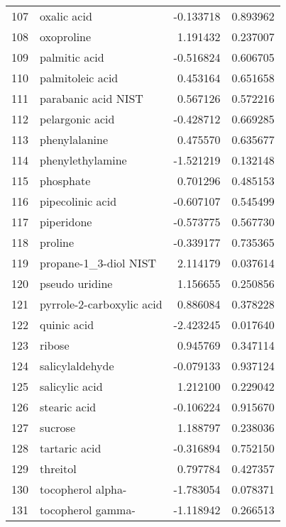 \begin{tabular}{llrr}
107 &                        oxalic acid & -0.133718 &  0.893962 \\
108 &                         oxoproline &  1.191432 &  0.237007 \\
109 &                      palmitic acid & -0.516824 &  0.606705 \\
110 &                   palmitoleic acid &  0.453164 &  0.651658 \\
111 &                parabanic acid NIST &  0.567126 &  0.572216 \\
112 &                    pelargonic acid & -0.428712 &  0.669285 \\
113 &                      phenylalanine &  0.475570 &  0.635677 \\
114 &                   phenylethylamine & -1.521219 &  0.132148 \\
115 &                          phosphate &  0.701296 &  0.485153 \\
116 &                   pipecolinic acid & -0.607107 &  0.545499 \\
117 &                         piperidone & -0.573775 &  0.567730 \\
118 &                            proline & -0.339177 &  0.735365 \\
119 &              propane-1\_3-diol NIST &  2.114179 &  0.037614 \\
120 &                     pseudo uridine &  1.156655 &  0.250856 \\
121 &          pyrrole-2-carboxylic acid &  0.886084 &  0.378228 \\
122 &                        quinic acid & -2.423245 &  0.017640 \\
123 &                             ribose &  0.945769 &  0.347114 \\
124 &                    salicylaldehyde & -0.079133 &  0.937124 \\
125 &                     salicylic acid &  1.212100 &  0.229042 \\
126 &                       stearic acid & -0.106224 &  0.915670 \\
127 &                            sucrose &  1.188797 &  0.238036 \\
128 &                      tartaric acid & -0.316894 &  0.752150 \\
129 &                           threitol &  0.797784 &  0.427357 \\
130 &                  tocopherol alpha- & -1.783054 &  0.078371 \\
131 &                  tocopherol gamma- & -1.118942 &  0.266513 \\

\end{tabular}
